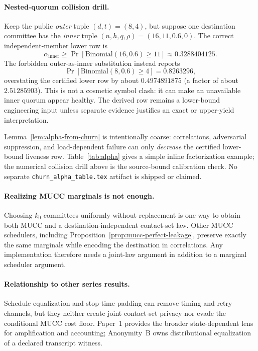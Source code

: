 \documentclass[11pt]{article}
\begin{document}
\paragraph{Nested-quorum collision drill.}
Keep the public \emph{outer} tuple $(d,t)=(8,4)$, but suppose one destination committee has the \emph{inner} tuple $(n,h,q,\rho)=(16,11,0.6,0)$.  The correct independent-member lower row is
\[
\alpha_{\mathrm{inner}}\ge \Pr[\mathrm{Binomial}(16,0.6)\ge11]\approx0.3288404125.
\]
The forbidden outer-as-inner substitution instead reports
\[
\Pr[\mathrm{Binomial}(8,0.6)\ge4]=0.8263296,
\]
overstating the certified lower row by about $0.4974891875$ (a factor of about $2.51285903$).  This is not a cosmetic symbol clash: it can make an unavailable inner quorum appear healthy.  The derived row remains a lower-bound engineering input unless separate evidence justifies an exact or upper-yield interpretation.

Lemma~\ref{lem:alpha-from-churn} is intentionally coarse: correlations, adversarial suppression, and load-dependent failure can only \emph{decrease} the certified lower-bound liveness row.
Table~\ref{tab:alpha} gives a simple inline factorization example; the numerical collision drill above is the source-bound calibration check.  No separate \texttt{churn\_alpha\_table.tex} artifact is shipped or claimed.

\paragraph{Realizing MUCC marginals is not enough.}
Choosing $k_0$ committees uniformly without replacement is one way to obtain both MUCC and a destination-independent contact-set law.  Other MUCC schedulers, including Proposition~\ref{prop:mucc-perfect-leakage}, preserve exactly the same marginals while encoding the destination in correlations.  Any implementation therefore needs a joint-law argument in addition to a marginal scheduler argument.

\paragraph{Relationship to other series results.}
Schedule equalization and stop-time padding can remove timing and retry channels, but they neither create joint contact-set privacy nor evade the conditional MUCC cost floor.  Paper~1 provides the broader state-dependent lens for amplification and accounting; Anonymity~B owns distributional equalization of a declared transcript witness.
\end{document}
